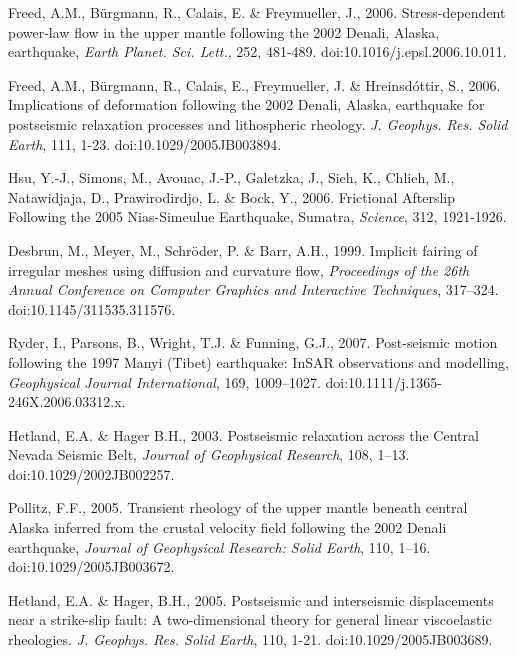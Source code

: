 \documentclass[extra]{gji}
\begin{document}
\begin{thebibliography}{}
 Freed, A.M.,
  B\"urgmann, R., Calais, E. \& Freymueller, J.,
  2006. Stress-dependent power-law flow in the upper mantle following
  the 2002 Denali, Alaska, earthquake, \textit{Earth
    Planet. Sci. Lett.}, 252, 481-489. doi:10.1016/j.epsl.2006.10.011.

 Freed, A.M., B\"urgmann,
  R., Calais, E., Freymueller, J. \& Hreinsd\'ottir, S.,
  2006. Implications of deformation following the 2002 Denali, Alaska,
  earthquake for postseismic relaxation processes and lithospheric
  rheology. \textit{J. Geophys. Res. Solid Earth}, 111,
  1-23. doi:10.1029/2005JB003894.

 Hsu, Y.-J., Simons, M., Avouac,
  J.-P., Galetzka, J., Sieh, K., Chlieh, M., Natawidjaja, D.,
  Prawirodirdjo, L. \& Bock, Y., 2006. Frictional Afterslip Following
  the 2005 Nias-Simeulue Earthquake, Sumatra, \textit{Science}, 312,
  1921-1926.

 Desbrun, M., Meyer, M.,
  Schr\"oder, P. \& Barr, A.H., 1999.  Implicit fairing of irregular
  meshes using diffusion and curvature flow, \textit{Proceedings of
    the 26th Annual Conference on Computer Graphics and Interactive
    Techniques}, 317–324. doi:10.1145/311535.311576.

 Ryder, I., Parsons, B.,
  Wright, T.J. \& Funning, G.J., 2007.  Post-seismic motion following
  the 1997 Manyi (Tibet) earthquake: InSAR observations and
  modelling, \textit{Geophysical Journal International}, 169,
  1009–1027. doi:10.1111/j.1365-246X.2006.03312.x.

 Hetland, E.A. \&
  Hager B.H., 2003. Postseismic relaxation across the Central
    Nevada Seismic Belt, \textit{Journal of Geophysical Research}, 108,
  1–13. doi:10.1029/2002JB002257.

Pollitz, F.F., 2005. Transient
  rheology of the upper mantle beneath central Alaska inferred from
  the crustal velocity field following the 2002 Denali earthquake,
  \textit{Journal of Geophysical Research: Solid Earth}, 110,
  1–16. doi:10.1029/2005JB003672.

 Hetland, E.A. \&
  Hager, B.H., 2005. Postseismic and interseismic displacements near a
  strike-slip fault: A two-dimensional theory for general linear
  viscoelastic rheologies. \textit{J. Geophys. Res. Solid Earth}, 110,
  1-21. doi:10.1029/2005JB003689.


\end{thebibliography}
\end{document}
